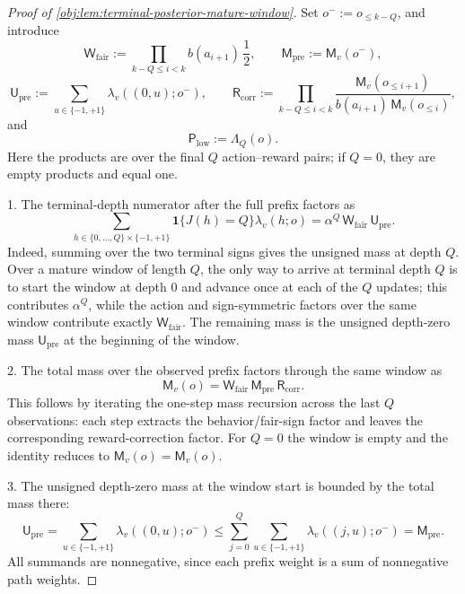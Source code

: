 \documentclass[11pt]{article}
\begin{document}
\begin{proof}[Proof of \cref{obj:lem:terminal-posterior-mature-window}]
Set \(o^-:=o_{\le k-Q}\), and introduce
\[
\mathsf W_{\mathrm{fair}}
:=
\prod_{k-Q\le i<k}
 b(a_{i+1})\,\frac12,
\qquad
\mathsf M_{\mathrm{pre}}:=\mathsf M_v(o^-),
\]
\[
\mathsf U_{\mathrm{pre}}
:=
\sum_{u\in\{-1,+1\}}\lambda_v((0,u);o^-),
\qquad
\mathsf R_{\mathrm{corr}}
:=
\prod_{k-Q\le i<k}
\frac{
\mathsf M_v(o_{\le i+1})
}{
b(a_{i+1})\,\mathsf M_v(o_{\le i})
},
\]
and
\[
\mathsf P_{\mathrm{low}}:=\Lambda_Q(o).
\]
Here the products are over the final \(Q\) action--reward pairs; if \(Q=0\), they are empty products and equal one.

1. The terminal-depth numerator after the full prefix factors as
\[
\sum_{h\in\{0,\ldots,Q\}\times\{-1,+1\}}
\mathbf 1\{J(h)=Q\}\lambda_v(h;o)
=
\alpha^Q\,\mathsf W_{\mathrm{fair}}\,\mathsf U_{\mathrm{pre}} .
\]
Indeed, summing over the two terminal signs gives the unsigned mass at depth \(Q\).  Over a mature window of length \(Q\), the only way to arrive at terminal depth \(Q\) is to start the window at depth \(0\) and advance once at each of the \(Q\) updates; this contributes \(\alpha^Q\), while the action and sign-symmetric factors over the same window contribute exactly \(\mathsf W_{\mathrm{fair}}\).  The remaining mass is the unsigned depth-zero mass \(\mathsf U_{\mathrm{pre}}\) at the beginning of the window. %

2. The total mass over the observed prefix factors through the same window as
\[
\mathsf M_v(o)
=
\mathsf W_{\mathrm{fair}}\,
\mathsf M_{\mathrm{pre}}\,
\mathsf R_{\mathrm{corr}} .
\]
This follows by iterating the one-step mass recursion across the last \(Q\) observations: each step extracts the behavior/fair-sign factor and leaves the corresponding reward-correction factor.  For \(Q=0\) the window is empty and the identity reduces to \(\mathsf M_v(o)=\mathsf M_v(o)\). %

3. The unsigned depth-zero mass at the window start is bounded by the total mass there:
\[
\mathsf U_{\mathrm{pre}}
=
\sum_{u\in\{-1,+1\}}\lambda_v((0,u);o^-)
\le
\sum_{j=0}^Q\sum_{u\in\{-1,+1\}}\lambda_v((j,u);o^-)
=
\mathsf M_{\mathrm{pre}} .
\]
All summands are nonnegative, since each prefix weight is a sum of nonnegative path weights. %


\end{proof}
\end{document}
